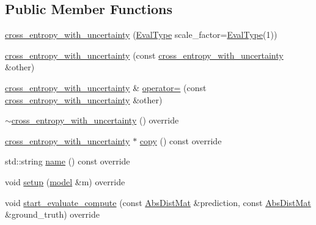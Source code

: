 \subsection*{Public Member Functions}
\begin{DoxyCompactItemize}
\item 
\hyperlink{classlbann_1_1cross__entropy__with__uncertainty_a93f0ab9861859a3b54fc5c723a27aaaa}{cross\+\_\+entropy\+\_\+with\+\_\+uncertainty} (\hyperlink{base_8hpp_a3266f5ac18504bbadea983c109566867}{Eval\+Type} scale\+\_\+factor=\hyperlink{base_8hpp_a3266f5ac18504bbadea983c109566867}{Eval\+Type}(1))
\item 
\hyperlink{classlbann_1_1cross__entropy__with__uncertainty_ae6d8025fb046ae3bd3d05321fb1b40d4}{cross\+\_\+entropy\+\_\+with\+\_\+uncertainty} (const \hyperlink{classlbann_1_1cross__entropy__with__uncertainty}{cross\+\_\+entropy\+\_\+with\+\_\+uncertainty} \&other)
\item 
\hyperlink{classlbann_1_1cross__entropy__with__uncertainty}{cross\+\_\+entropy\+\_\+with\+\_\+uncertainty} \& \hyperlink{classlbann_1_1cross__entropy__with__uncertainty_a036433c9c57e030d1923543dc211813a}{operator=} (const \hyperlink{classlbann_1_1cross__entropy__with__uncertainty}{cross\+\_\+entropy\+\_\+with\+\_\+uncertainty} \&other)
\item 
\hyperlink{classlbann_1_1cross__entropy__with__uncertainty_a617b8a1a308c086284ca6f43e88acca6}{$\sim$cross\+\_\+entropy\+\_\+with\+\_\+uncertainty} () override
\item 
\hyperlink{classlbann_1_1cross__entropy__with__uncertainty}{cross\+\_\+entropy\+\_\+with\+\_\+uncertainty} $\ast$ \hyperlink{classlbann_1_1cross__entropy__with__uncertainty_a3df6ab2f0b06922f860096636242b1bd}{copy} () const override
\item 
std\+::string \hyperlink{classlbann_1_1cross__entropy__with__uncertainty_a56d734c6665ac1752d8ef821edf2f464}{name} () const override
\item 
void \hyperlink{classlbann_1_1cross__entropy__with__uncertainty_a44a47468f1d04734068d085417eeab93}{setup} (\hyperlink{classlbann_1_1model}{model} \&m) override
\item 
void \hyperlink{classlbann_1_1cross__entropy__with__uncertainty_abed10e5c6eb2fd72b3b72ad1042fe35c}{start\+\_\+evaluate\+\_\+compute} (const \hyperlink{base_8hpp_a9a697a504ae84010e7439ffec862b470}{Abs\+Dist\+Mat} \&prediction, const \hyperlink{base_8hpp_a9a697a504ae84010e7439ffec862b470}{Abs\+Dist\+Mat} \&ground\+\_\+truth) override
\item 

\end{DoxyCompactItemize}
